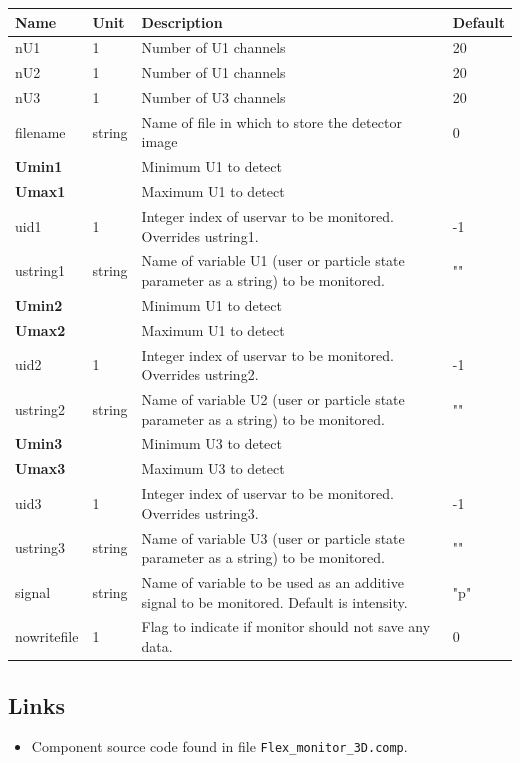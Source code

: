 \begin{longtable}{p{}p{}p{}p{}}
\toprule
\textbf{Name} & \textbf{Unit} & \textbf{Description} & \textbf{Default} \\
\midrule
\endhead
nU1 & 1 & Number of U1 channels & 20 \\
nU2 & 1 & Number of U1 channels & 20 \\
nU3 & 1 & Number of U3 channels & 20 \\
filename & string & Name of file in which to store the detector image & 0 \\
\textbf{Umin1} &  & Minimum U1 to detect &  \\
\textbf{Umax1} &  & Maximum U1 to detect &  \\
uid1 & 1 & Integer index of uservar to be monitored. Overrides ustring1. & -1 \\
ustring1 & string & Name of variable U1 (user or particle state parameter as a string) to be monitored. & "" \\
\textbf{Umin2} &  & Minimum U1 to detect &  \\
\textbf{Umax2} &  & Maximum U1 to detect &  \\
uid2 & 1 & Integer index of uservar to be monitored. Overrides ustring2. & -1 \\
ustring2 & string & Name of variable U2 (user or particle state parameter as a string) to be monitored. & "" \\
\textbf{Umin3} &  & Minimum U3 to detect &  \\
\textbf{Umax3} &  & Maximum U3 to detect &  \\
uid3 & 1 & Integer index of uservar to be monitored. Overrides ustring3. & -1 \\
ustring3 & string & Name of variable U3 (user or particle state parameter as a string) to be monitored. & "" \\
signal & string & Name of variable to be used as an additive signal to be monitored. Default is intensity. & "p" \\
nowritefile & 1 & Flag to indicate if monitor should not save any data. & 0 \\
\bottomrule
\end{longtable}

\subsection*{Links}
\begin{itemize}
  \item Component source code found in file \texttt{Flex\_monitor\_3D.comp}.
\end{itemize}
